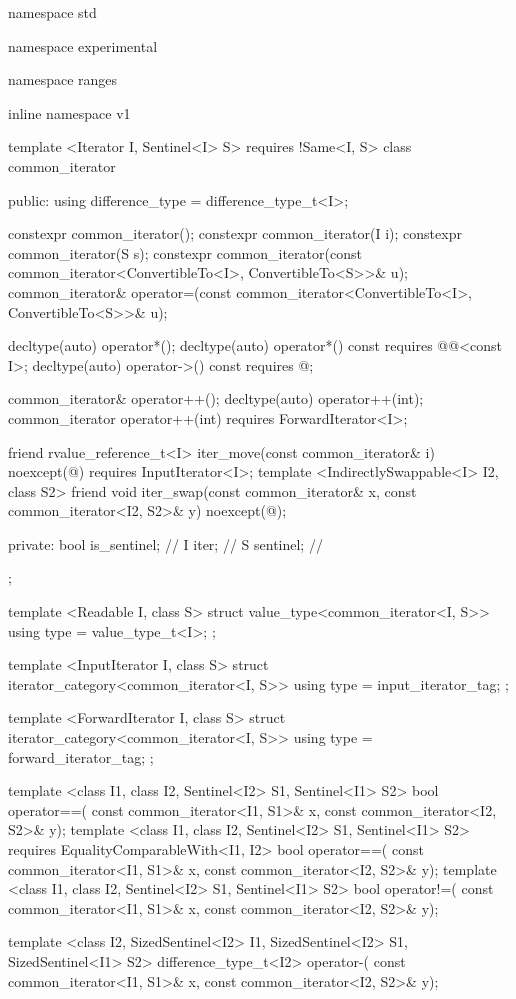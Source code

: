 %
\begin{codeblock}
namespace std { namespace experimental { namespace ranges { inline namespace v1 {
  template <Iterator I, Sentinel<I> S>
    requires !Same<I, S>
  class common_iterator {
  public:
    using difference_type = difference_type_t<I>;

    constexpr common_iterator();
    constexpr common_iterator(I i);
    constexpr common_iterator(S s);
    constexpr common_iterator(const common_iterator<ConvertibleTo<I>, ConvertibleTo<S>>& u);
    common_iterator& operator=(const common_iterator<ConvertibleTo<I>, ConvertibleTo<S>>& u);

    decltype(auto) operator*();
    decltype(auto) operator*() const
      requires @@<const I>;
    decltype(auto) operator->() const
      requires @\seebelow@;

    common_iterator& operator++();
    decltype(auto) operator++(int);
    common_iterator operator++(int)
      requires ForwardIterator<I>;

    friend rvalue_reference_t<I> iter_move(const common_iterator& i)
      noexcept(@\seebelow@)
        requires InputIterator<I>;
    template <IndirectlySwappable<I> I2, class S2>
      friend void iter_swap(const common_iterator& x, const common_iterator<I2, S2>& y)
        noexcept(@\seebelow@);

  private:
    bool is_sentinel; // \expos
    I iter;           // \expos
    S sentinel;       // \expos
  };

  template <Readable I, class S>
  struct value_type<common_iterator<I, S>> {
    using type = value_type_t<I>;
  };

  template <InputIterator I, class S>
  struct iterator_category<common_iterator<I, S>> {
    using type = input_iterator_tag;
  };

  template <ForwardIterator I, class S>
  struct iterator_category<common_iterator<I, S>> {
    using type = forward_iterator_tag;
  };

  template <class I1, class I2, Sentinel<I2> S1, Sentinel<I1> S2>
  bool operator==(
    const common_iterator<I1, S1>& x, const common_iterator<I2, S2>& y);
  template <class I1, class I2, Sentinel<I2> S1, Sentinel<I1> S2>
    requires EqualityComparableWith<I1, I2>
  bool operator==(
    const common_iterator<I1, S1>& x, const common_iterator<I2, S2>& y);
  template <class I1, class I2, Sentinel<I2> S1, Sentinel<I1> S2>
  bool operator!=(
    const common_iterator<I1, S1>& x, const common_iterator<I2, S2>& y);

  template <class I2, SizedSentinel<I2> I1, SizedSentinel<I2> S1, SizedSentinel<I1> S2>
  difference_type_t<I2> operator-(
    const common_iterator<I1, S1>& x, const common_iterator<I2, S2>& y);
}}}}
\end{codeblock}

